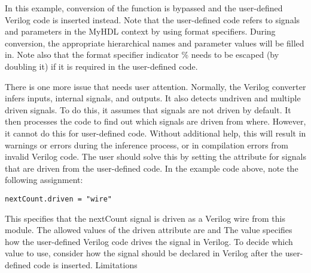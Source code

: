 In this example, conversion of the  function is bypassed and
the user-defined Verilog code is inserted instead. Note that the
user-defined code refers to signals and parameters in the MyHDL
context by using format specifiers. During conversion, the appropriate
hierarchical names and parameter values will be filled in. Note also
that the format specifier indicator \% needs to be escaped (by doubling
it) if it is required in the user-defined code.

There is one more issue that needs user attention. Normally, the
Verilog converter infers inputs, internal signals, and outputs. It
also detects undriven and multiple driven signals. To do this, it
assumes that signals are not driven by default. It then processes the
code to find out which signals are driven from where. However, it
cannot do this for user-defined code. Without additional help, this
will result in warnings or errors during the inference process, or in
compilation errors from invalid Verilog code. The user should solve
this by setting the  attribute for signals that are driven from
the user-defined code. In the example code above, note the following
assignment:

\begin{verbatim}
nextCount.driven = "wire"
\end{verbatim}

This specifies that the nextCount signal is driven as a Verilog wire
from this module. The allowed values of the driven attribute are
 and  The value specifies how the
user-defined Verilog code drives the signal in Verilog. To decide
which value to use, consider how the signal should be declared in
Verilog after the user-defined code is inserted.  Limitations


